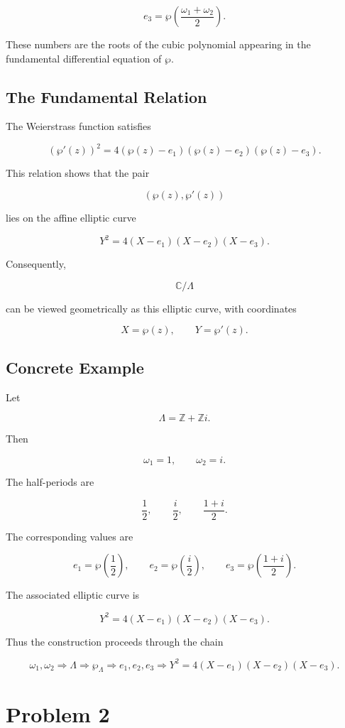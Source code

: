 \documentclass[12pt,a4paper]{article}
\theoremstyle{notespace}
\begin{document}
\[
e_3
=
\wp\!\left(\frac{\omega_1+\omega_2}{2}\right).
\]

These numbers are the roots of the cubic polynomial appearing in the fundamental differential equation of \(\wp\).

\subsection{The Fundamental Relation}

The Weierstrass function satisfies

\[
(\wp'(z))^2
=
4(\wp(z)-e_1)
(\wp(z)-e_2)
(\wp(z)-e_3).
\]

This relation shows that the pair

\[
(\wp(z),\wp'(z))
\]

lies on the affine elliptic curve

\[
\boxed{
	Y^2
	=
	4(X-e_1)(X-e_2)(X-e_3).
}
\]

Consequently,

\[
\mathbb C/\Lambda
\]

can be viewed geometrically as this elliptic curve, with coordinates

\[
X=\wp(z),
\qquad
Y=\wp'(z).
\]

\subsection{Concrete Example}

Let

\[
\Lambda
=
\mathbb Z+\mathbb Zi.
\]

Then

\[
\omega_1=1,
\qquad
\omega_2=i.
\]

The half-periods are

\[
\frac12,
\qquad
\frac{i}{2},
\qquad
\frac{1+i}{2}.
\]

The corresponding values are

\[
e_1=\wp\!\left(\frac12\right),
\qquad
e_2=\wp\!\left(\frac{i}{2}\right),
\qquad
e_3=\wp\!\left(\frac{1+i}{2}\right).
\]

The associated elliptic curve is

\[
Y^2
=
4(X-e_1)(X-e_2)(X-e_3).
\]

Thus the construction proceeds through the chain

\[
\omega_1,\omega_2
\Longrightarrow
\Lambda
\Longrightarrow
\wp_\Lambda
\Longrightarrow
e_1,e_2,e_3
\Longrightarrow
Y^2=4(X-e_1)(X-e_2)(X-e_3).
\]

\section{Problem 2}
\end{document}
